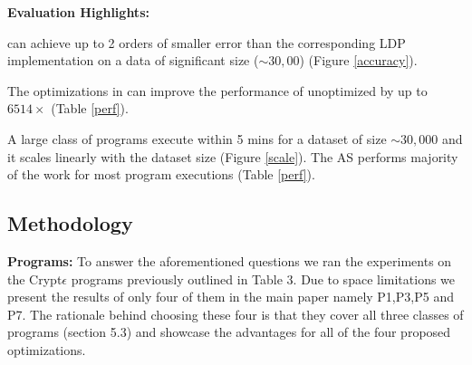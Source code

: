 \textbf{Evaluation Highlights:}
\squishlist \item \system can achieve up to 2 orders of smaller error than the corresponding
\textsf{LDP} implementation on a data of significant size ($\sim 30,00$) (Figure \ref{accuracy}).
\item The optimizations in \system can improve the performance
of unoptimized \system by up to $6514\times$ (Table \ref{perf}).
\item A large class of \system programs execute within
 5 mins for a dataset of size $\sim 30,000$  and it scales linearly with the dataset size (Figure \ref{scale}). The \textsf{AS} performs majority of the work for most program executions (Table \ref{perf}).
\squishend
\vspace{-0.5cm}\subsection{Methodology} 
\textbf{Programs:}
To answer the aforementioned questions we ran the experiments on the Crypt$\epsilon$ programs previously outlined in Table 3. Due to space limitations we present the results of only four of them in the main paper namely P1,P3,P5 and P7. The rationale behind choosing these four is that they cover all three classes of programs (section 5.3) and showcase the advantages for all of the four proposed optimizations. %
